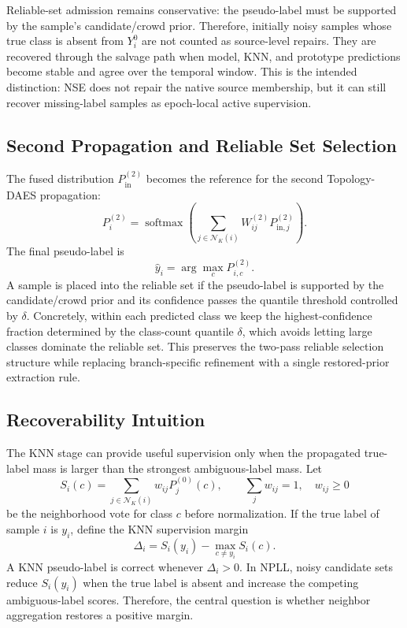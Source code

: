Reliable-set admission remains conservative: the pseudo-label must be supported
by the sample's candidate/crowd prior. Therefore, initially noisy samples whose
true class is absent from $Y_i^0$ are not counted as source-level repairs. They
are recovered through the salvage path when model, KNN, and prototype
predictions become stable and agree over the temporal window. This is the
intended distinction: NSE does not repair the native source membership, but it
can still recover missing-label samples as epoch-local active supervision.

\subsection{Second Propagation and Reliable Set Selection}
The fused distribution $P^{(2)}_{\mathrm{in}}$ becomes the reference for the
second Topology-DAES propagation:
\begin{equation}
    P^{(2)}_i =
    \operatorname{softmax}
    \left(
    \sum_{j\in\mathcal{N}_K(i)}
    W^{(2)}_{ij}P^{(2)}_{\mathrm{in},j}
    \right).
    \label{eq:stage2}
\end{equation}
The final pseudo-label is
\begin{equation}
    \hat{y}_i = \arg\max_c P^{(2)}_{i,c}.
\end{equation}
A sample is placed into the reliable set if the pseudo-label is supported by
the candidate/crowd prior and its confidence passes the quantile threshold
controlled by $\delta$. Concretely, within each predicted class we keep the
highest-confidence fraction determined by the class-count quantile
$\delta$, which avoids letting large classes dominate the reliable set. This
preserves the two-pass reliable selection structure while replacing
branch-specific refinement with a single restored-prior extraction rule.

\subsection{Recoverability Intuition}
The KNN stage can provide useful supervision only when the propagated true-label
mass is larger than the strongest ambiguous-label mass. Let
\begin{equation}
    S_i(c)=\sum_{j\in\mathcal{N}_K(i)} w_{ij}P^{(0)}_j(c),
    \qquad
    \sum_{j}w_{ij}=1,\quad w_{ij}\ge 0
\end{equation}
be the neighborhood vote for class $c$ before normalization. If the true label
of sample $i$ is $y_i$, define the KNN supervision margin
\begin{equation}
    \Delta_i =
    S_i(y_i) - \max_{c\ne y_i} S_i(c).
    \label{eq:knn_margin}
\end{equation}
A KNN pseudo-label is correct whenever $\Delta_i>0$. In NPLL, noisy candidate
sets reduce $S_i(y_i)$ when the true label is absent and increase the competing
ambiguous-label scores. Therefore, the central question is whether neighbor
aggregation restores a positive margin.

